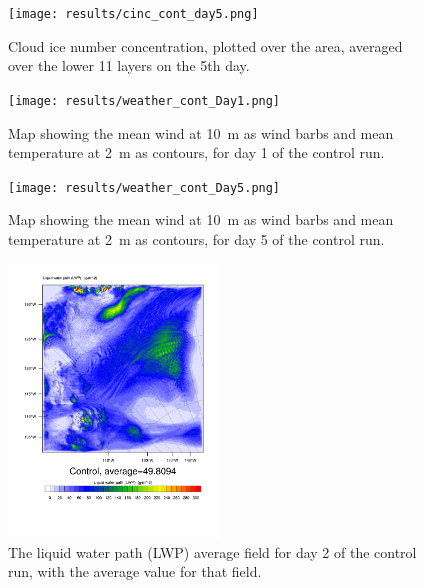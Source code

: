 \begin{figure}[h]
\centering
\texttt{[image: results/cinc\_cont\_day5.png]}
\caption{Cloud ice number concentration, plotted over the area, averaged over the lower 11 layers on the 5th day.}
\label{fig:cinc_cont_Day5}
\end{figure}

\begin{figure}[h]
\centering
\texttt{[image: results/weather\_cont\_Day1.png]}
\caption{Map showing the mean wind at 10~m as wind barbs and mean temperature at 2~m as contours, for day 1 of the control run.}
\label{fig:weather_cont_Day1}
\end{figure}

\begin{figure}[h]
\centering
\texttt{[image: results/weather\_cont\_Day5.png]}
\caption{Map showing the mean wind at 10~m as wind barbs and mean temperature at 2~m as contours, for day 5 of the control run.}
\label{fig:weather_cont_Day5}
\end{figure}


\begin{figure}[h]
\centering
\includegraphics[width=0.5\textwidth]{results/LWP_Day1.pdf}
\caption{The liquid water path (LWP) average field for day 2 of the control run, with the average value for that field.}
\label{fig:LWPr1Day1}
\end{figure}

